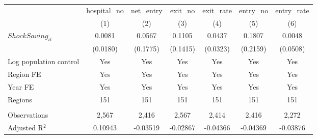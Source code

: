 \begingroup
\centering
\begin{tabular}{lcccccc}
   \toprule
                          & hospital\_no  & net\_entry  & exit\_no  & exit\_rate  & entry\_no  & entry\_rate \\    
                          & (1)           & (2)         & (3)       & (4)         & (5)        & (6)\\  
   \midrule 
   $ShockSaving_{it}$     & 0.0081        & 0.0567      & 0.1105    & 0.0437      & 0.1807     & 0.0048\\   
                          & (0.0180)      & (0.1775)    & (0.1415)  & (0.0323)    & (0.2159)   & (0.0508)\\   
   Log population control & Yes           & Yes         & Yes       & Yes         & Yes        & Yes\\  
   Region FE              & Yes           & Yes         & Yes       & Yes         & Yes        & Yes\\  
   Year FE                & Yes           & Yes         & Yes       & Yes         & Yes        & Yes\\  
   Regions                & 151           & 151         & 151       & 151         & 151        & 151\\  
    \\
   Observations           & 2,567         & 2,416       & 2,567     & 2,414       & 2,416      & 2,272\\  
   Adjusted R$^2$         & 0.10943       & -0.03519    & -0.02867  & -0.04366    & -0.04369   & -0.03876\\  
   \bottomrule
\end{tabular}
\par\endgroup
